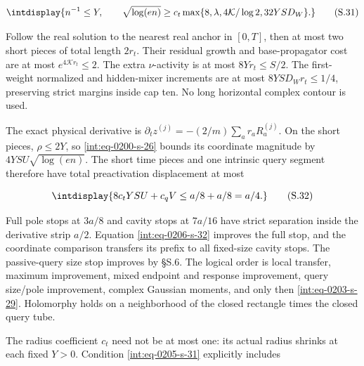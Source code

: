 \begingroup\renewcommand{\theHequation}{intdisplay.418}
\begin{equation}
\intdisplay{
n^{-1}\le Y,\qquad
\sqrt{\log(en)}\ge c_t\max\{8,\lambda,
                             4\mathcal K/\log2,32YSD_W\}.
}
\tag{S.31}
\label{int:eq-0205-s-31}
\end{equation}
\endgroup


Follow the real solution to the nearest real anchor in \([0,\allowbreak T]\), then at most two short pieces of total length \(2r_t\). Their residual growth and base-propagator cost are at most \(e^{4\mathcal Kr_t}\le2\). The extra \(\nu\)-activity is at most \(8Yr_t\le S/2\). The first-weight normalized and hidden-mixer increments are at most \(8YSD_Wr_t\le1/4\), preserving strict margins inside cap ten. No long horizontal complex contour is used.



The exact physical derivative is \(\partial_tz^{(j)}=-(2/m)\sum_ar_aR_a^{(j)}\). On the short pieces, \(\rho\le2Y\), so \eqref{int:eq-0200-s-26} bounds its coordinate magnitude by \(4YSU\sqrt{\log(en)}\). The short time pieces and one intrinsic query segment therefore have total preactivation displacement at most


\begingroup\renewcommand{\theHequation}{intdisplay.419}
\begin{equation}
\intdisplay{
8c_tYSU+c_qV\le a/8+a/8=a/4.
}
\tag{S.32}
\label{int:eq-0206-s-32}
\end{equation}
\endgroup


Full pole stops at \(3a/8\) and cavity stops at \(7a/16\) have strict separation inside the derivative strip \(a/2\). Equation \eqref{int:eq-0206-s-32} improves the full stop, and the coordinate comparison transfers its prefix to all fixed-size cavity stops. The passive-query size stop improves by §S.6. The logical order is local transfer, maximum improvement, mixed endpoint and response improvement, query size/pole improvement, complex Gaussian moments, and only then \eqref{int:eq-0203-s-29}. Holomorphy holds on a neighborhood of the closed rectangle times the closed query tube.



The radius coefficient \(c_t\) need not be at most one: its actual radius shrinks at each fixed \(Y>0\). Condition \eqref{int:eq-0205-s-31} explicitly includes


